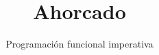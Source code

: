 \documentclass{beamer}
\title{Ahorcado}
\subtitle{Programación funcional imperativa}
\author{}
\institute{Stack Builders}
\date{}
\begin{document}
\frame{\titlepage}
\end{document}
